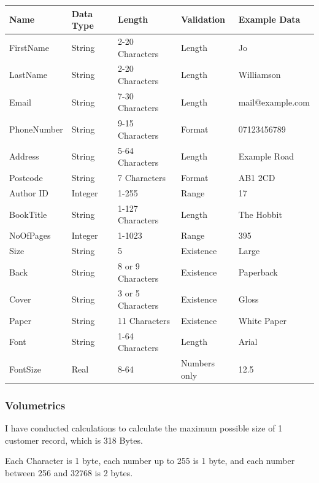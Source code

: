 \begin{center}
\begin{tabular}{|p{2.5cm}|p{1.5cm}|p{2.5cm}|p{2.5cm}|p{3.5cm}|}
    \hline
    \textbf{Name} & \textbf{Data Type} & \textbf{Length} & \textbf{Validation} & \textbf{Example Data} \\ \hline
    FirstName & String & 2-20 Characters & Length & Jo  \\ \hline
    LastName & String & 2-20 Characters & Length & Williamson  \\ \hline
    Email & String & 7-30 Characters & Length & mail@example.com  \\ \hline
    PhoneNumber & String & 9-15 Characters & Format & 07123456789  \\ \hline
    Address & String & 5-64 Characters & Length & Example Road  \\ \hline
    Postcode & String & 7 Characters & Format & AB1 2CD  \\ \hline
    Author ID & Integer & 1-255 & Range & 17  \\ \hline
    BookTitle & String & 1-127 Characters & Length & The Hobbit  \\ \hline
    NoOfPages & Integer & 1-1023 & Range & 395  \\ \hline
    Size & String & 5 & Existence & Large \\ \hline
    Back & String & 8 or 9 Characters& Existence & Paperback  \\ \hline
    Cover & String & 3 or 5 Characters & Existence & Gloss \\ \hline
    Paper & String & 11 Characters & Existence & White Paper\\ \hline
    Font & String & 1-64 Characters & Length & Arial  \\ \hline
    FontSize & Real & 8-64 & Numbers only & 12.5  \\ \hline
    \hline
\end{tabular}
\end{center}

\subsubsection{Volumetrics}

I have conducted calculations to calculate the maximum  possible size of 1 customer record, which is 318 Bytes.

Each Character is 1 byte, each number up to 255 is 1 byte, and each number between 256 and 32768 is 2 bytes.

